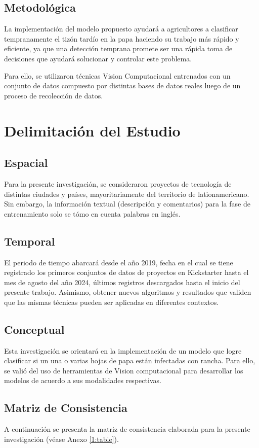 \subsection{Metodológica}
La implementación del modelo propuesto ayudará a agricultores a clasificar tempranamente el tizón tardío en la papa haciendo su trabajo más rápido y eficiente, ya que una detección temprana promete ser una rápida toma de decisiones que ayudará solucionar y controlar este problema.

Para ello, se utilizaron técnicas Vision Computacional entrenados con un conjunto de datos compuesto por distintas bases de datos reales luego de un proceso de recolección de datos.

\section{Delimitación del Estudio}

\subsection{Espacial}
Para la presente investigación, se consideraron proyectos de tecnología de distintas ciudades y países, mayoritariamente del territorio de lationamericano. Sin embargo, la información textual (descripción y comentarios) para la fase de entrenamiento solo se tómo en cuenta palabras en inglés.

\subsection{Temporal}
El periodo de tiempo abarcará desde el año 2019, fecha en el cual se tiene registrado los primeros conjuntos de datos de proyectos en Kickstarter hasta el mes de agosto del año 2024, últimos registros descargados hasta el inicio del presente trabajo. Asimismo, obtener nuevos algoritmos y resultados que validen que las mismas técnicas pueden ser aplicadas en diferentes contextos.

\subsection{Conceptual}
Esta investigación se orientará en la implementación de un modelo que logre clasificar si un una o varias hojas de papa están infectadas con rancha. Para ello, se valió del uso de herramientas de Vision computacional  para desarrollar los modelos de acuerdo a sus modalidades respectivas.
\subsection{Matriz de Consistencia}
A continuación se presenta la matriz de consistencia elaborada para la presente investigación (véase Anexo \ref{1:table}).